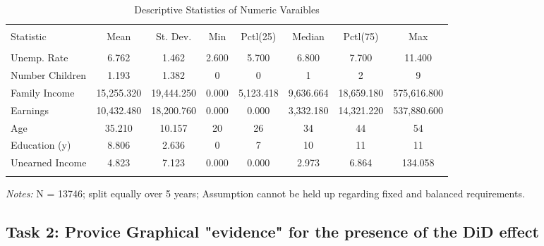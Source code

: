\documentclass[a4paper]{article}
\begin{document}
\begin{table}[!htbp] 
\begin{adjustwidth}{-0cm}{-0cm}
\begin{threeparttable}
\small
\captionsetup{font=small, justification=raggedright,singlelinecheck=false}
  \caption{Descriptive Statistics of Numeric Varaibles} 
  \label{} 
\begin{tabular}{@{\extracolsep{4pt}}lccccccc} 
\\[-5.8ex]\hline 
\hline \\[-1.8ex] 
Statistic & \multicolumn{1}{c}{Mean} & \multicolumn{1}{c}{St. Dev.} & \multicolumn{1}{c}{Min} & \multicolumn{1}{c}{Pctl(25)} & \multicolumn{1}{c}{Median} & \multicolumn{1}{c}{Pctl(75)} & \multicolumn{1}{c}{Max} \\ 
\hline \\[-1.8ex] 
Unemp. Rate & 6.762 & 1.462 & 2.600 & 5.700 & 6.800 & 7.700 & 11.400 \\ 
Number Children & 1.193 & 1.382 & 0 & 0 & 1 & 2 & 9 \\ 
Family Income & 15,255.320 & 19,444.250 & 0.000 & 5,123.418 & 9,636.664 & 18,659.180 & 575,616.800 \\ 
Earnings & 10,432.480 & 18,200.760 & 0.000 & 0.000 & 3,332.180 & 14,321.220 & 537,880.600 \\ 
Age & 35.210 & 10.157 & 20 & 26 & 34 & 44 & 54 \\ 
Education (y) & 8.806 & 2.636 & 0 & 7 & 10 & 11 & 11 \\ 
Unearned Income & 4.823 & 7.123 & 0.000 & 0.000 & 2.973 & 6.864 & 134.058 \\ 
\hline \\[-3.6ex] 
\end{tabular} 
\begin{tablenotes}
      \small
      \item\textit{Notes:} N = 13746; split equally over 5 years; Assumption cannot be held up regarding fixed and balanced requirements.
    \end{tablenotes}
\end{threeparttable}
\end{adjustwidth}
\end{table}

\subsection{Task 2: Provice Graphical "evidence" for the presence of the DiD effect}
\end{document}
